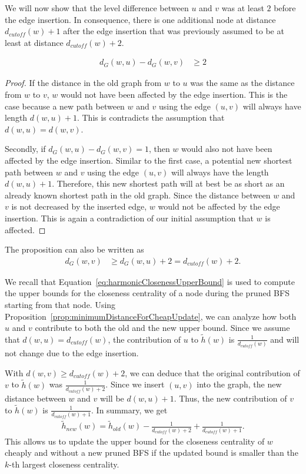 We will now show that the level difference between $u$ and $v$ was at least $2$ before the edge insertion. In consequence, there is one additional node at distance $d_{cutoff}(w) + 1$ after the edge insertion that was previously assumed to be at least at distance $d_{cutoff}(w) + 2$.

\begin{proposition}
\label{prop:minimumDistanceForCheapUpdate}
	\begin{align*}
	 	d_G(w, u) - d_G(w, v) &\geq 2
	\end{align*}
\end{proposition}
\begin{proof}
If the distance in the old graph from $w$ to $u$ was the same as the distance from $w$ to $v$, $w$ would not have been affected by the edge insertion. This is the case because a new path between $w$ and $v$ using the edge $(u, v)$ will always have length $d(w, u) + 1$. This is contradicts the assumption that $d(w, u) = d(w, v)$.

Secondly, if $d_G(w, u) - d_G(w, v) = 1$, then $w$ would also not have been affected by the edge insertion. Similar to the first case, a potential new shortest path between $w$ and $v$ using the edge $(u, v)$ will always have the length $d(w, u) + 1$. Therefore, this new shortest path will at best be as short as an already known shortest path in the old graph. Since the distance between $w$ and $v$ is not decreased by the inserted edge, $w$ would not be affected by the edge insertion. This is again a contradiction of our initial assumption that $w$ is affected.
\end{proof}

The proposition can also be written as
\begin{align}
	d_G(w, v) &\geq d_G(w, u) + 2 = d_{cutoff}(w) + 2.
\end{align}

We recall that Equation~\ref{eq:harmonicClosenessUpperBound} is used to compute the upper bounds for the closeness centrality of a node during the pruned BFS starting from that node. Using Proposition~\ref{prop:minimumDistanceForCheapUpdate}, we can analyze how both $u$ and $v$ contribute to both the old and the new upper bound. Since we assume that $d(w, u) = d_{cutoff}(w)$, the contribution of $u$ to $\widetilde{h}(w)$ is $\frac{1}{d_{cutoff}(w)}$ and will not change due to the edge insertion.

With $d(w, v) \geq d_{cutoff}(w) + 2$, we can deduce that the original contribution of $v$ to $\widetilde{h}(w)$ was $\frac{1}{d_{cutoff}(w) + 2}$. Since we insert $(u, v)$ into the graph, the new distance between $w$ and $v$ will be $d(w, u) + 1$. Thus, the new contribution of $v$ to $\widetilde{h}(w)$ is $\frac{1}{d_{cutoff}(w) + 1}$. In summary, we get
\begin{align}
	\widetilde{h}_{new}(w) = \widetilde{h}_{old}(w) - \frac{1}{d_{cutoff}(w) + 2} + \frac{1}{d_{cutoff}(w) + 1} \label{eq:cheapBoundaryUpdate}.
\end{align}
This allows us to update the upper bound for the closeness centrality of $w$ cheaply and without a new pruned BFS if the updated bound is smaller than the $k$-th largest closeness centrality.


